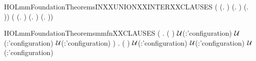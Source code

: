\begin{SaveVerbatim}{HOLmmFoundationTheoremsINXXUNIONXXINTERXXCLAUSES}
\HOLTokenTurnstile{} (\HOLTokenLeftbrace{} \HOLTokenBar{}  \HOLConst{\HOLTokenIn{}} (\HOLTokenLambda{}.   \HOLSymConst{\HOLTokenConj{}}  )\HOLTokenRightbrace{} \HOLSymConst{=} (\HOLTokenLambda{}.  ) \HOLConst{\HOLTokenInter{}} (\HOLTokenLambda{}.  )) \HOLSymConst{\HOLTokenConj{}}
   (\HOLTokenLeftbrace{} \HOLTokenBar{}  \HOLConst{\HOLTokenIn{}} (\HOLTokenLambda{}.   \HOLSymConst{\HOLTokenDisj{}}  )\HOLTokenRightbrace{} \HOLSymConst{=} (\HOLTokenLambda{}.  ) \HOLConst{\HOLTokenUnion{}} (\HOLTokenLambda{}.  ))
\end{SaveVerbatim}
\newcommand{\HOLmmFoundationTheoremsINXXUNIONXXINTERXXCLAUSES}{\UseVerbatim{HOLmmFoundationTheoremsINXXUNIONXXINTERXXCLAUSES}}
\begin{SaveVerbatim}{HOLmmFoundationTheoremsmmfnXXCLAUSES}
\HOLTokenTurnstile{} (\HOLSymConst{\HOLTokenForall{}}   .
        (  ) \ensuremath{\cal{U}}(:'configuration)  \HOLSymConst{=}
         \ensuremath{\cal{U}}(:'configuration)  \HOLConst{\HOLTokenInter{}}
         \ensuremath{\cal{U}}(:'configuration) ) \HOLSymConst{\HOLTokenConj{}}
   \HOLSymConst{\HOLTokenForall{}}   .
       (  ) \ensuremath{\cal{U}}(:'configuration)  \HOLSymConst{=}
        \ensuremath{\cal{U}}(:'configuration)  \HOLConst{\HOLTokenUnion{}}
        \ensuremath{\cal{U}}(:'configuration) 
\end{SaveVerbatim}
